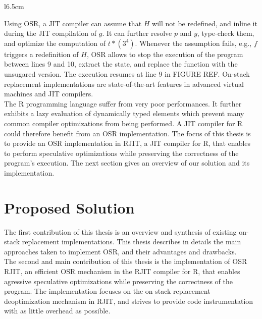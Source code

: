 \begin{wrapfigure}[11]{l}{6.5cm}
\end{wrapfigure}
Using OSR, a JIT compiler can assume that $H$ will not be redefined, and inline it during the JIT compilation of $g$.
It can further resolve $p$ and $y$, type-check them, and optimize the computation of $t * (3 ^ 4)$.
Whenever the assumption fails, e.g., $f$ triggers a redefinition of $H$, OSR allows to stop the execution of the program between lines 9 and 10, extract the state, and replace the function with the unsugared version.
The execution resumes at line 9 in FIGURE REF.
On-stack replacement implementations are state-of-the-art features in advanced virtual machines and JIT compilers.\\


The R programming language suffer from very poor performances. 
It further exhibits a lazy evaluation of dynamically typed elements which prevent many common compiler optimizations from being performed.
A JIT compiler for R could therefore benefit from an OSR implementation.
The focus of this thesis is to provide an OSR implementation in RJIT, a JIT compiler for R, that enables to perform speculative optimizations while preserving the correctness of the program's execution.
The next section gives an overview of our solution and its implementation.\\

\section{Proposed Solution}
The first contribution of this thesis is an overview and synthesis of existing on-stack replacement implementations.
This thesis describes in details the main approaches taken to implement OSR, and their advantages and drawbacks.\\

The second and main contribution of this thesis is the implementation of OSR RJIT, an efficient OSR mechanism in the RJIT compiler for R, that enables agressive speculative optimizations while preserving the correctness of the program.
The implementation focuses on the on-stack replacement deoptimization mechanism in RJIT, and strives to provide code instrumentation with as little overhead as possible.\\

